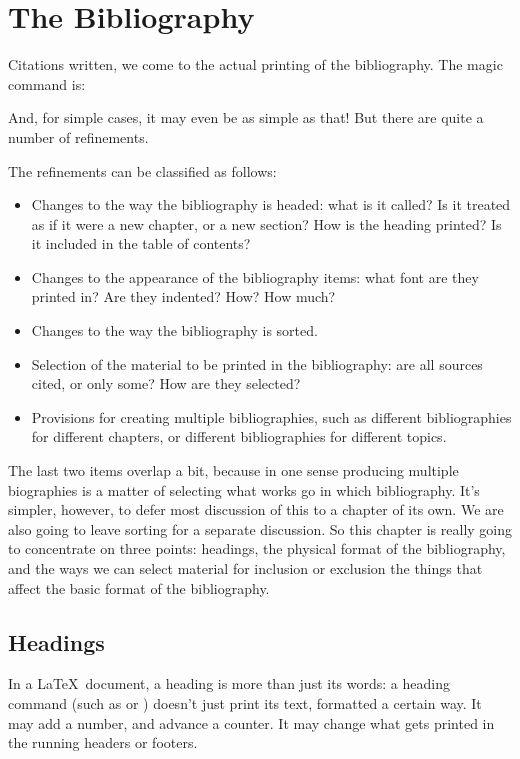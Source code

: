 \chapter{The Bibliography}

Citations written, we come to the actual printing of the
bibliography. The magic command is:
\begin{center}
\end{center}
And, for simple cases, it may even be as simple as that! But there are
quite a number of refinements.

The refinements can be classified as follows:
\begin{itemize}
\item Changes to the way the bibliography is headed: what is it
  called? Is it treated as if it were a new chapter, or a new section?
  How is the heading printed? Is it included in the table of contents?
\item Changes to the appearance of the bibliography items: what font
  are they printed in? Are they indented? How? How much?
\item Changes to the way the bibliography is sorted.
\item Selection of the material to be printed in the bibliography: are
  all sources cited, or only some? How are they selected?
\item Provisions for creating multiple bibliographies, such as
  different bibliographies for different chapters, or different
  bibliographies for different topics.
\end{itemize}
The last two items overlap a bit, because in one sense producing
multiple biographies is a matter of selecting what works go in which
bibliography. It's simpler, however, to defer most discussion of this
to a chapter of its own. We are also going to leave sorting for a
separate discussion. So this chapter is really going to concentrate on
three points: headings, the physical format of the bibliography, and
the ways we can select material for inclusion or exclusion the things
that affect the basic format of the bibliography.

\section{Headings}

In a \LaTeX\ document, a heading is more than just its words: a
heading command (such as  or ) doesn't just
print its text, formatted a certain way. It may add a number, and
advance a counter. It may change what gets printed in the running
headers or footers.

